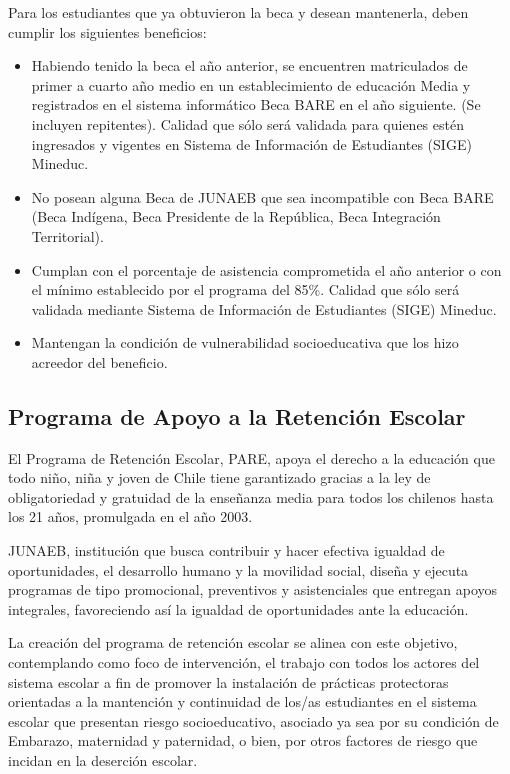 Para los estudiantes que ya obtuvieron la beca y desean mantenerla, deben cumplir los siguientes beneficios: 
\begin{itemize} 
\item Habiendo tenido la beca el año anterior, se encuentren matriculados de primer a cuarto año medio en un establecimiento de educación Media y registrados en el sistema informático Beca BARE en el año siguiente. (Se incluyen repitentes). Calidad que sólo será validada para quienes estén ingresados y vigentes en Sistema de Información de Estudiantes (SIGE) Mineduc.
\item No posean alguna Beca de JUNAEB que sea incompatible con Beca BARE (Beca Indígena, Beca Presidente de la República, Beca Integración Territorial).
\item Cumplan con el porcentaje de asistencia comprometida el año anterior o con el mínimo establecido por el programa del 85\%. Calidad que sólo será validada mediante Sistema de Información de Estudiantes (SIGE) Mineduc.
\item Mantengan la condición de vulnerabilidad socioeducativa que los hizo acreedor del beneficio. 
\end{itemize}

\subsection{Programa de Apoyo a la Retención Escolar}
El Programa de Retención Escolar, PARE, apoya el derecho a la educación que todo niño, niña y joven de Chile tiene garantizado gracias a la ley de obligatoriedad y gratuidad de la enseñanza media para todos los chilenos hasta los 21 años, promulgada en el año 2003.

JUNAEB, institución que busca contribuir y hacer efectiva igualdad de oportunidades, el desarrollo humano y la movilidad social, diseña y ejecuta programas de tipo promocional, preventivos y asistenciales que entregan apoyos integrales, favoreciendo así la igualdad de oportunidades ante la educación.

La creación del programa de retención escolar se alinea con este objetivo, contemplando como foco de intervención, el trabajo con todos los actores del sistema escolar a fin de promover la instalación de prácticas protectoras orientadas a la mantención y continuidad de los/as estudiantes en el sistema escolar que presentan riesgo socioeducativo, asociado ya sea por su condición de Embarazo, maternidad y paternidad, o bien, por otros factores de riesgo que incidan en la deserción escolar.

